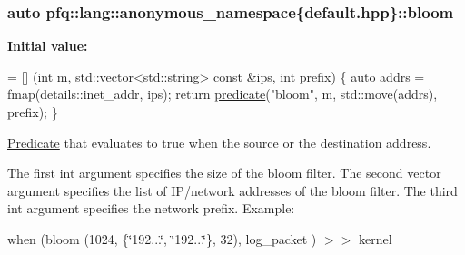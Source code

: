 \subsubsection[{\texorpdfstring{bloom}{bloom}}]{\setlength{\rightskip}{0pt plus 5cm}auto pfq\+::lang\+::anonymous\+\_\+namespace\{default.\+hpp\}\+::bloom}\hypertarget{namespacepfq_1_1lang_1_1anonymous__namespace_02default_8hpp_03_abfcd230137acb93cfd99f7a0a7c1f17f}{}\label{namespacepfq_1_1lang_1_1anonymous__namespace_02default_8hpp_03_abfcd230137acb93cfd99f7a0a7c1f17f}
{\bfseries Initial value\+:}
\begin{DoxyCode}
= [] (\textcolor{keywordtype}{int} m, std::vector<std::string> \textcolor{keyword}{const} &ips, \textcolor{keywordtype}{int} prefix) \{
                                \textcolor{keyword}{auto} addrs = fmap(details::inet\_addr, ips);
                                \textcolor{keywordflow}{return} \hyperlink{namespacepfq_1_1lang_aca9adafc436b7f851621b979fa1aaf88}{predicate}(\textcolor{stringliteral}{"bloom"}, m, std::move(addrs), prefix);
                          \}
\end{DoxyCode}


\hyperlink{structpfq_1_1lang_1_1Predicate}{Predicate} that evaluates to {\ttfamily true} when the source or the destination address. 

The first {\ttfamily int} argument specifies the size of the bloom filter. The second {\ttfamily vector} argument specifies the list of I\+P/network addresses of the bloom filter. The third {\ttfamily int} argument specifies the network prefix. Example\+:

when (bloom (1024, \{\char`\"{}192...\char`\"{}, \char`\"{}192...\char`\"{}\}, 32), log\+\_\+packet ) $>$$>$ kernel 
